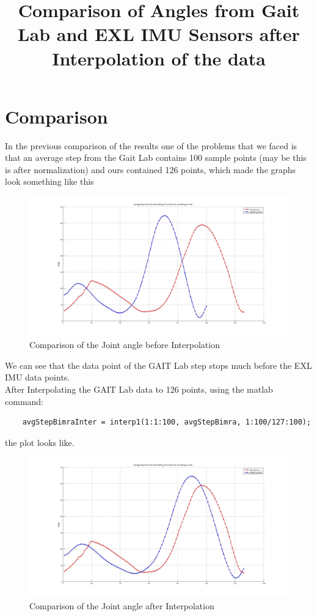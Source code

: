 \documentclass[12pt]{article}
\title{Comparison of Angles from Gait Lab and EXL IMU Sensors after Interpolation of the data}
\author{}
\begin{document}
\maketitle


\section*{Comparison}

In the previous comparison of the results one of the problems that we faced is that an average step from the Gait Lab contains 100 sample points (may be this is after normalization) and ours contained 126 points, which made the graphs look something like this

\begin{figure}[!htb]
\centering
\includegraphics[scale=.25]{NormalCompareacRKFE.jpg}
\caption{Comparison of the Joint angle before Interpolation}
\label{acRKFEOld}
\end{figure}

\FloatBarrier

We can see that the data point of the GAIT Lab step stops much before the EXL IMU data points.\\

After Interpolating the GAIT Lab data to 126 points, using the matlab command:
\begin{verbatim}
	avgStepBimraInter = interp1(1:1:100, avgStepBimra, 1:100/127:100);
\end{verbatim}

the plot looks like.

\begin{figure}[!htb]
\centering
\includegraphics[scale=.25]{interPolatedCompareacRKFE.jpg}
\caption{Comparison of the Joint angle after Interpolation}
\label{acRKFENew}
\end{figure}
\end{document}
